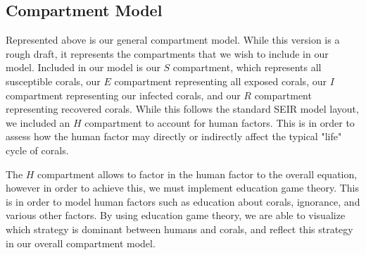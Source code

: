 \documentclass[12pt]{article}
\begin{document}
\subsection{Compartment Model}
\begin{center}
\end{center}

Represented above is our general compartment model. While this version is a rough draft, it represents the compartments that we wish to include in our model. Included in our model is our $S$ compartment, which represents all susceptible corals, our $E$ compartment representing all exposed corals, our $I$ compartment representing our infected corals, and our $R$ compartment representing recovered corals. While this follows the standard SEIR model layout, we included an $H$ compartment to account for human factors. This is in order to assess how the human factor may directly or indirectly affect the typical "life" cycle of corals. \par
The $H$ compartment allows to factor in the human factor to the overall equation, however in order to achieve this, we must implement education game theory. This is in order to model human factors such as education about corals, ignorance, and various other factors. By using education game theory, we are able to visualize which strategy is dominant between humans and corals, and reflect this strategy in our overall compartment model.
\end{document}
